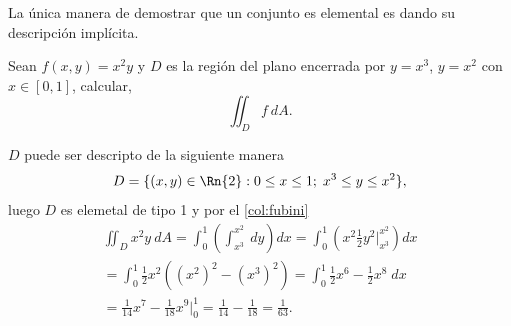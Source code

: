 \begin{obs} La \'unica manera de demostrar que un conjunto es elemental es dando su descripci\'on  impl\'icita.
\end{obs}


\begin{example}
     Sean $f(x,y)=x^2y$ y  $D$ es la regi\'on del plano encerrada por $y=x^3$, $y=x^2$  con $x\in[0,1]$,  calcular,  $$\iint_D f \:dA.$$  

    \begin{center}
    \end{center}

 $D$ puede ser descripto de la siguiente manera
    \[
        D=\{(x,y)\in\Rn{2}:0\leq x\leq1;\;x^3\leq y\leq x^2\},  
    \]
 luego $D$ es elemetal de tipo 1 y  por el \autoref{col:fubini}
    \begin{gather*}
        \iint_D x^2y\:dA=\int_0^1\left(\int_{x^3}^{x^2}\:dy\right)dx=\int_0^1\left(x^2\frac{1}{2}y^2\Big\lvert_{x^3}^{x^2}\right)dx\\
        =\int_0^1\frac{1}{2}x^2\left((x^2)^2-(x^3)^2\right)=\int_0^1\frac{1}{2}x^6-\frac{1}{2}x^8\;dx\\=\frac{1}{14}x^7-\frac{1}{18}x^9\Big\lvert_0^1=\frac{1}{14}-\frac{1}{18}=\frac{1}{63}.
    \end{gather*}
\end{example}

